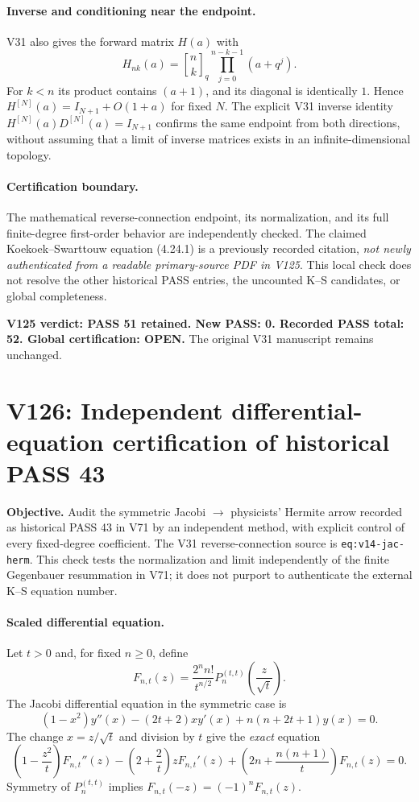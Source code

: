 \documentclass[11pt]{article}
\begin{document}
\paragraph{Inverse and conditioning near the endpoint.} V31 also gives the forward matrix $H(a)$ with
\[
 H_{nk}(a)={n\brack k}_q\prod_{j=0}^{n-k-1}(a+q^j).
\]
For $k<n$ its product contains $(a+1)$, and its diagonal is identically $1$. Hence $H^{[N]}(a)=I_{N+1}+O(1+a)$ for fixed $N$. The explicit V31 inverse identity $H^{[N]}(a)D^{[N]}(a)=I_{N+1}$ confirms the same endpoint from both directions, without assuming that a limit of inverse matrices exists in an infinite-dimensional topology.

\paragraph{Certification boundary.} The mathematical reverse-connection endpoint, its normalization, and its full finite-degree first-order behavior are independently checked. The claimed Koekoek--Swarttouw equation (4.24.1) is a previously recorded citation, \emph{not newly authenticated from a readable primary-source PDF in V125}. This local check does not resolve the other historical PASS entries, the uncounted K--S candidates, or global completeness.

\noindent\textbf{V125 verdict: PASS 51 retained. New PASS: 0. Recorded PASS total: 52. Global certification: OPEN.} The original V31 manuscript remains unchanged.


\clearpage
\section{V126: Independent differential-equation certification of historical PASS 43}
\noindent\textbf{Objective.} Audit the symmetric Jacobi $\to$ physicists' Hermite arrow recorded as historical PASS 43 in V71 by an independent method, with explicit control of every fixed-degree coefficient. The V31 reverse-connection source is \texttt{eq:v14-jac-herm}. This check tests the normalization and limit independently of the finite Gegenbauer resummation in V71; it does not purport to authenticate the external K--S equation number.

\paragraph{Scaled differential equation.} Let $t>0$ and, for fixed $n\ge0$, define
\[
 F_{n,t}(z)=\frac{2^n n!}{t^{n/2}}P_n^{(t,t)}\!\left(\frac{z}{\sqrt t}\right).
\]
The Jacobi differential equation in the symmetric case is
\[
 (1-x^2)y''(x)-(2t+2)xy'(x)+n(n+2t+1)y(x)=0.
\]
The change $x=z/\sqrt t$ and division by $t$ give the \emph{exact} equation
\begin{equation}\label{eq:v126-de}
 \boxed{\left(1-\frac{z^2}{t}\right)F_{n,t}''(z)
 -\left(2+\frac2t\right)zF_{n,t}'(z)
 +\left(2n+\frac{n(n+1)}t\right)F_{n,t}(z)=0.}
\end{equation}
Symmetry of $P_n^{(t,t)}$ implies $F_{n,t}(-z)=(-1)^nF_{n,t}(z)$.
\end{document}
